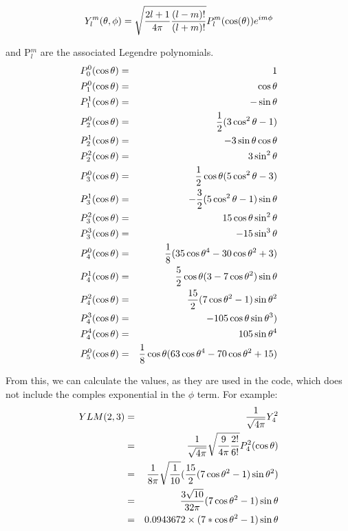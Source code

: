 \begin{equation}
Y_l^m(\theta, \phi) = \sqrt{ {2 l + 1 \over 4 \pi} {(l - m)! \over (l + m)!}}
P_l^m(\cos(\theta)) e^{i m \phi}
\end{equation}

and P$_l^m$ are the associated Legendre polynomials.\\
\begin{eqnarray}
P_0^0(\cos \theta)      &=&     1\nonumber\\
P_1^0(\cos \theta)      &=&     \cos \theta\nonumber\\
P_1^1(\cos \theta)      &=&     -\sin \theta\nonumber\\
P_2^0(\cos \theta)      &=&     {1 \over 2} (3 \cos^2 \theta - 1)\nonumber\\
P_2^1(\cos \theta)      &=&     -3\sin \theta\cos \theta\nonumber\\
P_2^2(\cos \theta)      &=&     3 \sin^2 \theta\nonumber\\
P_3^0(\cos \theta)      &=&     {1 \over 2}\cos \theta(5 \cos^2 \theta - 3)\nonumber\\
P_3^1(\cos \theta)      &=&     -{3 \over2} (5 \cos^2 \theta - 1)\sin \theta\nonumber\\
P_3^2(\cos \theta)      &=&     15\cos \theta \sin^2 \theta\nonumber\\
P_3^3(\cos \theta)      &=&     -15 \sin^3 \theta\nonumber\\
P_4^0(\cos\theta)       &=&     {1 \over 8}(35\cos\theta^4-30\cos\theta^2+3)\nonumber\\
P_4^1(\cos\theta)       &=&     {5 \over 2} \cos\theta(3-7\cos\theta^2)\sin\theta\nonumber\\
P_4^2(\cos\theta)       &=&     {15 \over 2} (7\cos\theta^2-1)\sin\theta^2\nonumber\\
P_4^3(\cos\theta)       &=&     -105 \cos\theta \sin\theta^3)\nonumber\\
P_4^4(\cos\theta)       &=&     105 \sin\theta^4\nonumber\\
P_5^0(\cos\theta)       &=&     {1 \over 8} \cos\theta(63\cos\theta^4-70\cos\theta^2+15)\nonumber\\
\end{eqnarray}

From this, we can calculate the values, as they are used in the code, which
does not include the comples exponential in the $\phi$ term. For example:\\

\begin{eqnarray}
YLM(2,3)&=&{1 \over \sqrt{4 \pi}} Y_4^2\nonumber\\
        &=&{1 \over \sqrt{4 \pi}}
          \sqrt{{9 \over 4 \pi} {2! \over 6!}}
          P_4^2(\cos\theta)\nonumber\\
        &=&{1 \over 8 \pi} \sqrt{1 \over 10}
           ({15 \over 2} (7\cos\theta^2-1) \sin\theta^2)\nonumber\\
        &=&{3 \sqrt{10} \over 32 \pi} (7 \cos\theta^2 - 1) \sin\theta\nonumber\\
        &=&0.0943672 \times (7 * \cos\theta^2 -1) \sin\theta\nonumber\\
\end{eqnarray}

